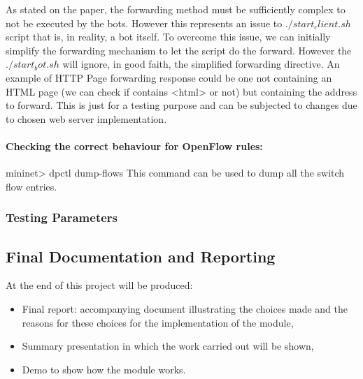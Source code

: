 As stated on the paper, the forwarding method must be sufficiently complex to not be executed by the bots. However this represents an issue to $./start_client.sh$ script that is, in reality, a bot itself. To overcome this issue, we can initially simplify the forwarding mechanism to let the script do the forward. However the $./start_bot.sh$ will ignore, in good faith, the simplified forwarding directive.
An example of HTTP Page forwarding response could be one not containing an HTML page (we can check if contains <html> or not) but containing the address to forward. This is just for a testing purpose and can be subjected to changes due to chosen web server implementation.

\paragraph{Checking the correct behaviour for OpenFlow rules:} 
mininet> dpctl dump-flows
This command can be used to dump all the switch flow entries.

\subsubsection{Testing Parameters}

\subsection{Final Documentation and Reporting}
At the end of this project will be produced:
\begin{itemize}
	\item Final report: accompanying document illustrating the choices made and the reasons for these choices for the implementation of the module,
	\item Summary presentation in which the work carried out will be shown,
	\item Demo to show how the module works.
\end{itemize}
